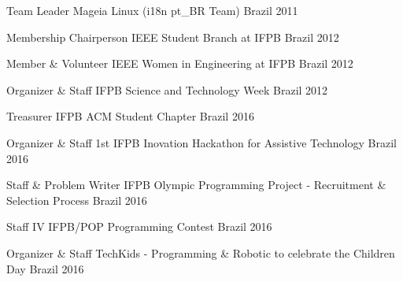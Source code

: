 

\begin{cvhonors}

  \cvhonor
    {Team Leader} %
    {Mageia Linux (i18n pt\_BR Team)} %
    {Brazil} %
    {2011} %

  \cvhonor
    {Membership Chairperson} %
    {IEEE Student Branch at IFPB} %
    {Brazil} %
    {2012} %
    
  \cvhonor
    {Member \& Volunteer} %
    {IEEE Women in Engineering at IFPB} %
    {Brazil} %
    {2012} %
        
  \cvhonor
    {Organizer \& Staff} %
    {IFPB Science and Technology Week} %
    {Brazil} %
    {2012} %

  \cvhonor
    {Treasurer} %
    {IFPB ACM Student Chapter} %
    {Brazil} %
    {2016} %

  \cvhonor
    {Organizer \& Staff} %
    {1st IFPB Inovation Hackathon for Assistive Technology} %
    {Brazil} %
    {2016} %

  \cvhonor
    {Staff \& Problem Writer} %
    {IFPB Olympic Programming Project - Recruitment \& Selection Process} %
    {Brazil} %
    {2016} %
    
  \cvhonor
    {Staff} %
    {IV IFPB/POP Programming Contest} %
    {Brazil} %
    {2016} %
    
  \cvhonor
    {Organizer \& Staff} %
    {TechKids - Programming \& Robotic to celebrate the Children Day} %
    {Brazil} %
    {2016} %

\end{cvhonors}
